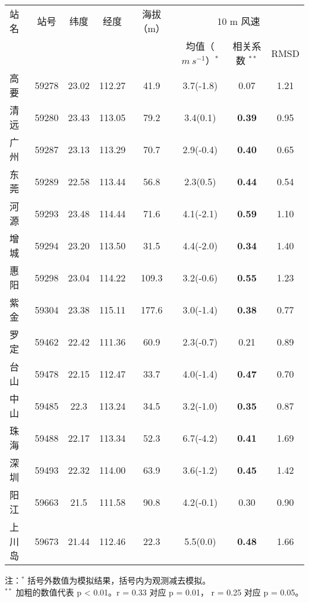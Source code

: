\begin{table}[!htbp]
    \label{tab:PRDsiteinfo}
    \centering
    \small%
    \setlength{\tabcolsep}{5 pt}%
    \renewcommand{\arraystretch}{1.0}%
    \begin{tabular}{lccccccc}
        \hline
        站名 & 站号 & 纬度 & 经度 & 海拔（m）&  \multicolumn{3}{c}{10 m 风速} \\
         & & & & & 均值（$m ~ s^{-1}$）$^*$ &  相关系数 $^ {**}$ & RMSD \\
        \hline
        高要 & 59278 & 23.02 & 112.27 & 41.9 & 3.7(-1.8) & 0.07 & 1.21 \\
        清远 & 59280 & 23.43 & 113.05 & 79.2 & 3.4(0.1) & \textbf{0.39} & 0.95 \\
        广州 & 59287 & 23.13 & 113.29 & 70.7 & 2.9(-0.4) & \textbf{0.40} & 0.65 \\
        东莞 & 59289 & 22.58 & 113.44 & 56.8 & 2.3(0.5) & \textbf{0.44} & 0.54 \\
        河源 & 59293 & 23.48 & 114.44 & 71.6 & 4.1(-2.1) & \textbf{0.59} & 1.10 \\
        增城 & 59294 & 23.20 & 113.50 & 31.5 & 4.4(-2.0) & \textbf{0.34} & 1.40 \\
        惠阳 & 59298 & 23.04 & 114.22 & 109.3 & 3.2(-0.6) & \textbf{0.55} & 1.23 \\
	   紫金 & 59304 & 23.38 & 115.11 & 177.6 & 3.0(-1.4) & \textbf{0.38} & 0.77 \\
	   罗定 & 59462 & 22.42 & 111.36 & 60.9 & 2.3(-0.7) & 0.21 & 0.89 \\
	   台山 & 59478 & 22.15 & 112.47 & 33.7 & 4.0(-1.4) & \textbf{0.47} & 0.70 \\
	   中山 & 59485 & 22.3 & 113.24 & 34.5 & 3.2(-1.0) & \textbf{0.35} & 0.87 \\
	   珠海 & 59488 & 22.17 & 113.34 & 52.3 & 6.7(-4.2) & \textbf{0.41} & 1.69\\
	   深圳 & 59493 & 22.32 & 114.00 & 63.9 & 3.6(-1.2) & \textbf{0.45} & 1.42 \\
	   阳江 & 59663 & 21.5 & 111.58 & 90.8 & 4.2(-0.1) & 0.30 & 0.90 \\
	   上川岛 & 59673 & 21.44 & 112.46 & 22.3 & 5.5(0.0) & \textbf{0.48} & 1.66 \\    
        \hline
    \end{tabular}
    
     \vspace*{3ex}
     
    \begin{minipage}{0.9\textwidth}%
    注：$^*$ 括号外数值为模拟结果，括号内为观测减去模拟。\\ 
    $^{**}$ 加粗的数值代表 p < 0.01。r = 0.33 对应 p = 0.01， r = 0.25 对应 p = 0.05。
    \end{minipage}
\end{table}

